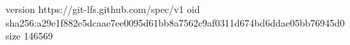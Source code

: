 version https://git-lfs.github.com/spec/v1
oid sha256:a29e1f882e5dcaae7ee0095d61bb8a7562c9af0311d674bd6ddae05bb76945d0
size 146569

